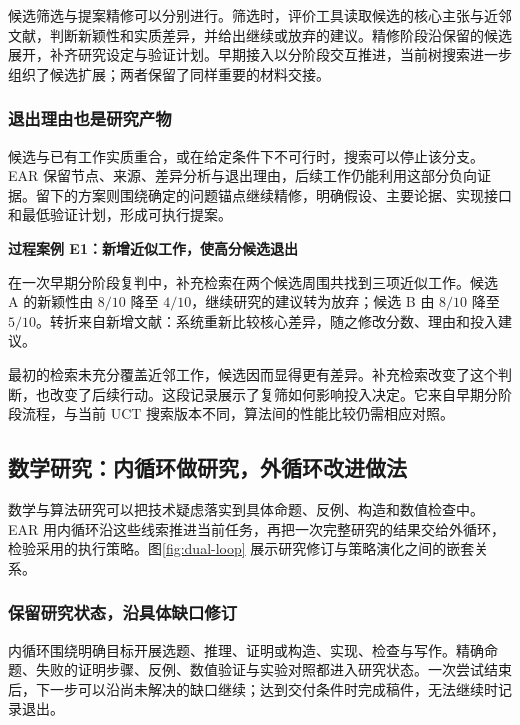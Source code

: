 候选筛选与提案精修可以分别进行。筛选时，评价工具读取候选的核心主张与近邻文献，判断新颖性和实质差异，并给出继续或放弃的建议。精修阶段沿保留的候选展开，补齐研究设定与验证计划。早期接入以分阶段交互推进，当前树搜索进一步组织了候选扩展；两者保留了同样重要的材料交接。

\subsubsection{退出理由也是研究产物}
候选与已有工作实质重合，或在给定条件下不可行时，搜索可以停止该分支。EAR 保留节点、来源、差异分析与退出理由，后续工作仍能利用这部分负向证据。留下的方案则围绕确定的问题锚点继续精修，明确假设、主要论据、实现接口和最低验证计划，形成可执行提案。

\begin{insight}
\textbf{过程案例 E1：新增近似工作，使高分候选退出}\par
在一次早期分阶段复判中，补充检索在两个候选周围共找到三项近似工作。候选 A 的新颖性由 $8/10$ 降至 $4/10$，继续研究的建议转为放弃；候选 B 由 $8/10$ 降至 $5/10$。转折来自新增文献：系统重新比较核心差异，随之修改分数、理由和投入建议。
\end{insight}

最初的检索未充分覆盖近邻工作，候选因而显得更有差异。补充检索改变了这个判断，也改变了后续行动。这段记录展示了复筛如何影响投入决定。它来自早期分阶段流程，与当前 UCT 搜索版本不同，算法间的性能比较仍需相应对照。

\FloatBarrier
\subsection{数学研究：内循环做研究，外循环改进做法}
\label{sec:math}
数学与算法研究可以把技术疑虑落实到具体命题、反例、构造和数值检查中。EAR 用内循环沿这些线索推进当前任务，再把一次完整研究的结果交给外循环，检验采用的执行策略。图\ref{fig:dual-loop} 展示研究修订与策略演化之间的嵌套关系。


\subsubsection{保留研究状态，沿具体缺口修订}
内循环围绕明确目标开展选题、推理、证明或构造、实现、检查与写作。精确命题、失败的证明步骤、反例、数值验证与实验对照都进入研究状态。一次尝试结束后，下一步可以沿尚未解决的缺口继续；达到交付条件时完成稿件，无法继续时记录退出。

